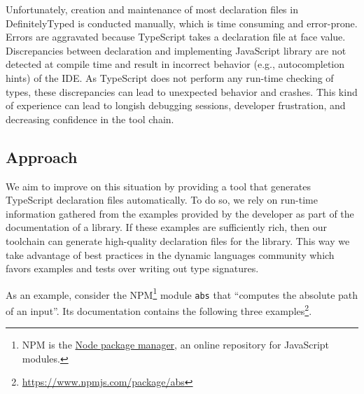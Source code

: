 \documentclass[sigplan,screen]{acmart}
\begin{document}
Unfortunately, creation and maintenance of most declaration
files in DefinitelyTyped is conducted manually,
which is time consuming and  error-prone. Errors are aggravated because TypeScript takes a
declaration file at face value. Discrepancies between declaration and
implementing JavaScript library are not detected at 
compile time and result in incorrect behavior (e.g., autocompletion
hints) of the IDE. 
As TypeScript does not perform any run-time 
checking of types, these  discrepancies can lead to unexpected 
behavior and crashes. This kind of experience can lead to longish debugging sessions,  developer
frustration, and decreasing confidence in the tool chain.

\subsection{Approach}
\label{sec:approach}

We aim to improve on this situation by providing a tool that generates
TypeScript declaration files automatically. To do so, we rely on run-time information
gathered from the examples provided
by the developer as part of the documentation of a library. If these
examples are sufficiently rich, then our toolchain can generate
high-quality declaration files for the library. This way we take
advantage of 
best practices in the dynamic languages community which favors
examples and tests over writing out type signatures.

As an example, consider the NPM\footnote{NPM is the \href{https://www.npmjs.com/}{Node package
  manager}, an online repository for JavaScript modules.} module
\texttt{abs} that
``computes the absolute path of an input''. Its documentation contains
the following three
examples\footnote{\url{https://www.npmjs.com/package/abs}}. 
\end{document}
